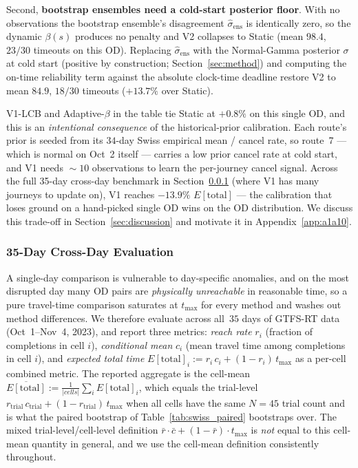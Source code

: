 \documentclass[opre,dblanonrev]{informs4}
\begin{document}
Second, \textbf{bootstrap ensembles need a cold-start posterior floor}.
With no
observations the bootstrap ensemble's disagreement
$\hat\sigma_{\mathrm{ens}}$ is identically zero, so the dynamic
$\beta(s)$ produces no penalty and V2 collapses to Static (mean
$98.4$, $23/30$ timeouts on this OD). Replacing
$\hat\sigma_{\mathrm{ens}}$ with the Normal-Gamma posterior
$\sigma$ at cold start (positive by construction;
Section~\ref{sec:method}) and computing the on-time reliability term
against the absolute clock-time deadline
restore V2 to mean $84.9$, $18/30$ timeouts ($+13.7\%$ over
Static).

V1-LCB and Adaptive-$\beta$ in the table tie Static at $+0.8\%$ on
this single OD, and this is an \emph{intentional consequence} of the
historical-prior calibration. Each route's prior is seeded
from its $34$-day Swiss empirical mean / cancel rate, so route~7 ---
which is normal on Oct~2 itself --- carries a low prior cancel
rate at cold start, and V1 needs $\!\sim\!10$ observations to learn
the per-journey cancel signal. Across the full 35-day cross-day
benchmark in Section~\ref{sec:swiss-multi-day} (where V1 has many
journeys to update on), V1 reaches $-13.9\%$ $E[\mathrm{total}]$ ---
the calibration that loses ground on a hand-picked single OD wins
on the OD distribution. We discuss this trade-off in
Section~\ref{sec:discussion} and motivate it in
Appendix~\ref{app:a1a10}.

\subsubsection{35-Day Cross-Day Evaluation}
\label{sec:swiss-multi-day}

A single-day comparison is vulnerable to day-specific anomalies, and
on the most disrupted day many OD pairs are \emph{physically
unreachable} in reasonable time, so a pure travel-time comparison
saturates at $t_{\max}$ for every method and washes out method
differences. We therefore evaluate across all~$35$ days of GTFS-RT
data (Oct~1--Nov~4, 2023), and report three metrics: \emph{reach rate}
$r_i$ (fraction of completions in cell $i$),
\emph{conditional mean} $c_i$ (mean travel time among completions in
cell $i$), and \emph{expected total time}
$E[\mathrm{total}]_i := r_i\,c_i + (1-r_i)\,t_{\max}$ as a per-cell
combined metric. The reported aggregate is the cell-mean
$\overline{E[\mathrm{total}]} := \frac{1}{|cells|}\sum_i E[\mathrm{total}]_i$,
which equals the trial-level
$r_{\mathrm{trial}}\,c_{\mathrm{trial}}+(1-r_{\mathrm{trial}})\,t_{\max}$
when all cells have the same $N=45$ trial count and is what the
paired bootstrap of Table~\ref{tab:swiss_paired} bootstraps over.
The mixed trial-level/cell-level definition $\bar r \cdot \bar c
+ (1-\bar r)\cdot t_{\max}$ is \emph{not} equal to this cell-mean
quantity in general, and we use the cell-mean definition
consistently throughout.
\end{document}
